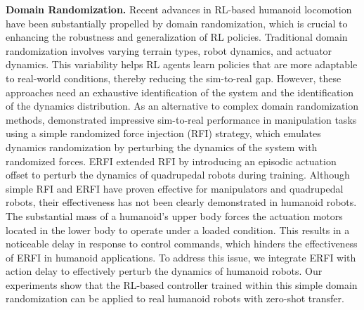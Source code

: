 \textbf{Domain Randomization.} Recent advances in RL-based humanoid locomotion \cite{radosavovic2024real,radosavovic2024learning} have been substantially propelled by domain randomization, which is crucial to enhancing the robustness and generalization of RL policies. Traditional domain randomization \cite{andrychowicz2020learning,radosavovic2024real} involves varying terrain types, robot dynamics, and actuator dynamics. This variability helps RL agents learn policies that are more adaptable to real-world conditions, thereby reducing the sim-to-real gap. However, these approaches need an exhaustive identification of the system and the identification of the dynamics distribution. As an alternative to complex domain randomization methods, \cite{valassakis2020crossing} demonstrated impressive sim-to-real performance in manipulation tasks using a simple randomized force injection (RFI) strategy, which emulates dynamics randomization by perturbing the dynamics of the system with randomized forces. ERFI \cite{campanaro2024learning} extended RFI by introducing an episodic actuation offset to perturb the dynamics of quadrupedal robots during training. Although simple RFI and ERFI have proven effective for manipulators and quadrupedal robots, their effectiveness has not been clearly demonstrated in humanoid robots. The substantial mass of a humanoid's upper body forces the actuation motors located in the lower body to operate under a loaded condition. This results in a noticeable delay in response to control commands, which hinders the effectiveness of ERFI in humanoid applications. To address this issue, we integrate ERFI with action delay to effectively perturb the dynamics of humanoid robots. Our experiments show that the RL-based controller trained within this simple domain randomization can be applied to real humanoid robots with zero-shot transfer.